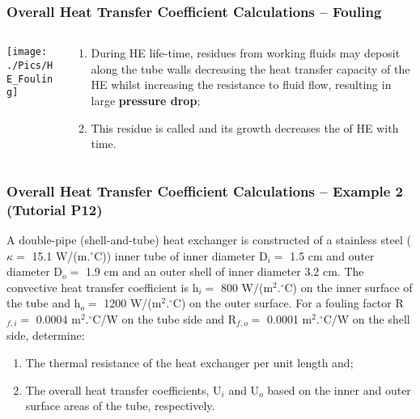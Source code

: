 \documentclass[10pt,compress,unknownkeysallowed]{beamer}
\begin{document}
\begin{frame}
  \frametitle{Overall Heat Transfer Coefficient Calculations -- Fouling}
    \begin{columns}
       \begin{column}[l]{0.5\linewidth}
         \texttt{[image: ./Pics/HE\_Fouling]}
       \end{column}
       \begin{column}[l]{0.5\linewidth}
          \begin{enumerate}\scriptsize
              \item<1-> During HE life-time, residues from working fluids may deposit along the tube walls decreasing the heat transfer capacity of the HE whilst increasing the resistance to fluid flow, resulting in large {\bf pressure drop};
              \item<1-> This residue is called  and its growth decreases the  of HE with time.
          \end{enumerate}
       \end{column}      
    \end{columns}


\end{frame}


\begin{frame}
  \frametitle{Overall Heat Transfer Coefficient Calculations -- Example 2 (Tutorial P12)}

A double-pipe (shell-and-tube) heat exchanger is constructed of a stainless steel ($\kappa=$ 15.1 W/(m.$^{\circ}$C)) inner tube of inner diameter D$_{i}=$ 1.5 cm and outer diameter D$_{o}=$ 1.9 cm and an outer shell of inner diameter 3.2 cm. The convective heat transfer coefficient is h$_{i}=$ 800 W/(m$^{2}.^{\circ}$C) on the inner surface of the tube and h$_{o}=$ 1200 W/(m$^{2}.^{\circ}$C) on the outer surface. For a fouling factor R$_{f,i}=$ 0.0004 m$^{2}.^{\circ}$C/W on the tube side and R$_{f,o}=$ 0.0001 m$^{2}.^{\circ}$C/W on the shell side, determine:
\begin{enumerate}
   \item The thermal resistance of the heat exchanger per unit length and; 
   \item The overall heat transfer coefficients, U$_{i}$ and U$_{o}$ based on the inner and outer surface areas of the tube, respectively.
\end{enumerate}

\end{frame}
\end{document}
